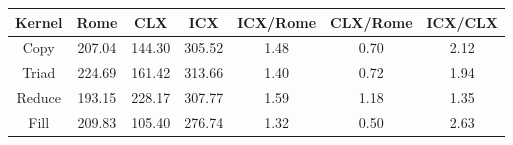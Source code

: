 \begin{tabular}{|c|c|c|c|c|c|c|}  \hline
Kernel&Rome&CLX&ICX & ICX/Rome & CLX/Rome & ICX/CLX \\ \hline 
Copy & 207.04 & 144.30 & 305.52  & 1.48 & 0.70 & 2.12 \\ \hline 
Triad & 224.69 & 161.42 & 313.66  & 1.40 & 0.72 & 1.94 \\ \hline 
Reduce & 193.15 & 228.17 & 307.77  & 1.59 & 1.18 & 1.35 \\ \hline 
Fill & 209.83 & 105.40 & 276.74  & 1.32 & 0.50 & 2.63 \\ \hline 
\end{tabular}
